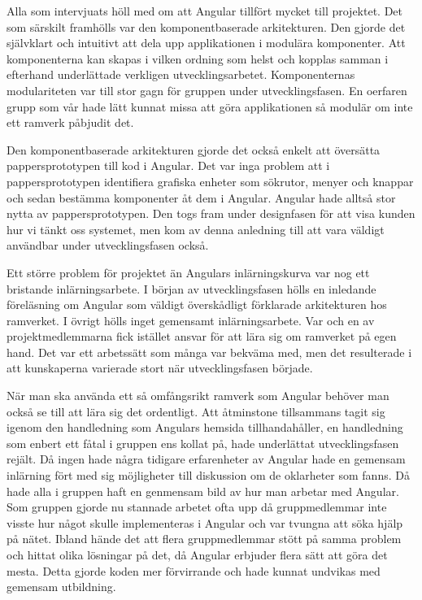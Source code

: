 Alla som intervjuats höll med om att Angular tillfört mycket till projektet. Det som särskilt framhölls var den komponentbaserade arkitekturen. Den gjorde det självklart och intuitivt att dela upp applikationen i modulära komponenter. Att komponenterna kan skapas i vilken ordning som helst och kopplas samman i efterhand underlättade verkligen utvecklingsarbetet. Komponenternas modulariteten var till stor gagn för gruppen under utvecklingsfasen. En oerfaren grupp som vår hade lätt kunnat missa att göra applikationen så modulär om inte ett ramverk påbjudit det.

Den komponentbaserade arkitekturen gjorde det också enkelt att översätta pappersprototypen till kod i Angular. Det var inga problem att i pappersprototypen identifiera grafiska enheter som sökrutor, menyer och knappar och sedan bestämma komponenter åt dem i Angular. Angular hade alltså stor nytta av pappersprototypen. Den togs fram under designfasen för att visa kunden hur vi tänkt oss systemet, men kom av denna anledning till att vara väldigt användbar under utvecklingsfasen också.

Ett större problem för projektet än Angulars inlärningskurva var nog ett bristande inlärningsarbete. I början av utvecklingsfasen hölls en inledande föreläsning om Angular som väldigt överskådligt förklarade arkitekturen hos ramverket. I övrigt hölls inget gemensamt inlärningsarbete. Var och en av projektmedlemmarna fick istället ansvar för att lära sig om ramverket på egen hand. Det var ett arbetssätt som många var bekväma med, men det resulterade i att kunskaperna varierade stort när utvecklingsfasen började. 

När man ska använda ett så omfångsrikt ramverk som Angular behöver man också se till att lära sig det ordentligt. Att åtminstone tillsammans tagit sig igenom den handledning som Angulars hemsida tillhandahåller, en handledning som enbert ett fåtal i gruppen ens kollat på, hade underlättat utvecklingsfasen rejält. Då ingen hade några tidigare erfarenheter av Angular hade en gemensam inlärning fört med sig möjligheter till diskussion om de oklarheter som fanns. Då hade alla i gruppen haft en genmensam bild av hur man arbetar med Angular. Som gruppen gjorde nu stannade arbetet ofta upp då gruppmedlemmar inte visste hur något skulle implementeras i Angular och var tvungna att söka hjälp på nätet. Ibland hände det att flera gruppmedlemmar stött på samma problem och hittat olika lösningar på det, då Angular erbjuder flera sätt att göra det mesta. Detta gjorde koden mer förvirrande och hade kunnat undvikas med gemensam utbildning.     

